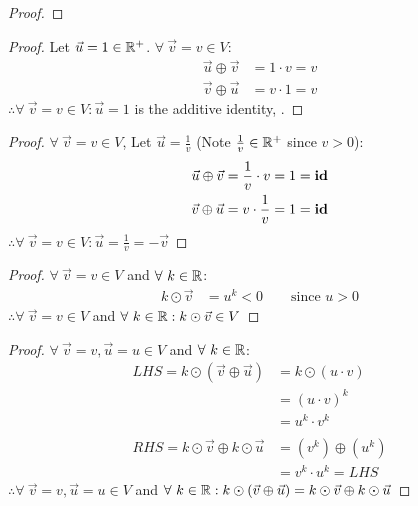\begin{enumerate}
\begin{proof}
  \end{proof}
  \begin{proof}
    Let $\vec{u} = 1 \in \mathbb{R}^+$. $\forall~\vec{v} = v \in V$:
    \begin{align*}
      \vec{u} \oplus \vec{v} & = 1 \cdot v = v \\
      \vec{v} \oplus \vec{u} & = v \cdot 1 = v
    \end{align*}
    $\therefore \forall~\vec{v} = v \in V: \vec{u} = 1$ is the additive identity, .
  \end{proof}
  \begin{proof}
    $\forall~\vec{v} = v \in V$, Let $\vec{u} = \frac{1}{v}$ (Note $\frac{1}{v} \in \mathbb{R}^+$ since $v > 0$):
    \begin{align*}
      \vec{u} \oplus \vec{v} & = \frac{1}{v} \cdot v = 1 = \text{\textbf{id}} \\
      \vec{v} \oplus \vec{u} & = v \cdot \frac{1}{v} = 1 = \text{\textbf{id}}
    \end{align*}
    $\therefore \forall~\vec{v} = v \in V: \vec{u} = \frac{1}{v} = -\vec{v}$
  \end{proof}
  \begin{proof}
    $\forall~\vec{v} = v \in V$ and $\forall~k \in \mathbb{R}$:
    \begin{align*}
      k \odot \vec{v} & = u^k < 0 \qquad \text{since $u>0$}
    \end{align*}
    $\therefore \forall~\vec{v} = v \in V$ and $\forall~k \in \mathbb{R}: k \odot \vec{v} \in V$
  \end{proof}
  \begin{proof}
    $\forall~\vec{v} = v,\vec{u} = u \in V$ and $\forall~k \in \mathbb{R}$:
    \begin{align*}
      LHS = k \odot (\vec{v} \oplus \vec{u})       & = k \odot (u \cdot v) \\
                                                   & = (u \cdot v)^k       \\
                                                   & = u^k \cdot v^k       \\ \\
      RHS = k \odot \vec{v} \oplus k \odot \vec{u} & = (v^k) \oplus (u^k)  \\
                                                   & = v^k \cdot u^k = LHS
    \end{align*}
    $\therefore \forall~\vec{v} = v,\vec{u} = u \in V$ and $\forall~k \in \mathbb{R}: k \odot (\vec{v} \oplus \vec{u}) = k \odot \vec{v} \oplus k \odot \vec{u}$

\end{proof}
\end{enumerate}
